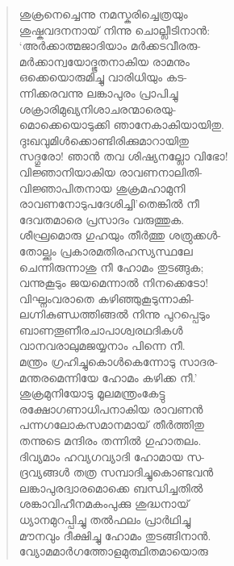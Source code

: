 \begin{verse}
ശുക്രനെച്ചെന്നു നമസ്കരിച്ചെത്രയും\\
ശുഷ്കവദനനായ് നിന്നു ചൊല്ലീടിനാന്‍:\\
‘അര്‍ക്കാത്മജാദിയാം മര്‍ക്കടവീരരു-\\
മര്‍ക്കാന്വയോദ്ഭൂതനാകിയ രാമനും\\
ഒക്കെയൊരുമിച്ചു വാരിധിയും കട-\\
ന്നിക്കരവന്നു ലങ്കാപുരം പ്രാപിച്ചു\\
ശക്രാരിമുഖ്യനിശാചരന്മാരെയു-\\
മൊക്കെയൊടുക്കി ഞാനേകാകിയായിതു.\\
ദുഃഖവുമിള്‍ക്കൊണ്ടിരിക്കുമാറായിതു\\
സദ്ഗുരോ! ഞാന്‍ തവ ശിഷ്യനല്ലോ വിഭോ!\\
വിജ്ഞാനിയാകിയ രാവണനാലിതി-\\
വിജ്ഞാപിതനായ ശുക്രമഹാമുനി\\
രാവണനോടുപദേശിച്ചി’തെങ്കില്‍ നീ\\
ദേവതമാരെ പ്രസാദം വരുത്തുക.\\
ശീഘ്രമൊരു ഗുഹയും തീര്‍ത്തു ശത്രുക്കള്‍-\\
തോല്ക്കും പ്രകാരമതിരഹസ്യസ്ഥലേ\\
ചെന്നിരുന്നാശു നീ ഹോമം തുടങ്ങുക;\\
വന്നുകൂടും ജയമെന്നാല്‍ നിനക്കെടോ!\\
വിഘ്നംവരാതെ കഴിഞ്ഞുകൂടുന്നാകി-\\
ലഗ്നികുണ്ഡത്തിങ്ങല്‍ നിന്നു പുറപ്പെടും\\
ബാണതൂണീരചാപാശ്വരഥദികള്‍\\
വാനവരാലുമജയ്യനാം പിന്നെ നീ.\\
മന്ത്രം ഗ്രഹിച്ചുകൊള്‍കെന്നോടു സാദര-\\
മന്തരമെന്നിയേ ഹോമം കഴിക്ക നീ.’\\
ശുക്രമുനിയോടു മൂലമന്ത്രംകേട്ടു\\
രക്ഷോഗണാധിപനാകിയ രാവണന്‍\\
പന്നഗലോകസമാനമായ് തീര്‍ത്തിതു\\
തന്നുടെ മന്ദിരം തന്നില്‍ ഗുഹാതലം.\\
ദിവ്യമാം ഹവ്യഗവ്യാദി ഹോമായ സ-\\
ദ്രവ്യങ്ങള്‍ തത്ര സമ്പാദിച്ചുകൊണ്ടവന്‍\\
ലങ്കാപുരദ്വാരമൊക്കെ ബന്ധിച്ചതില്‍\\
ശങ്കാവിഹീനമകംപുക്കു ശുദ്ധനായ്\\
ധ്യാനമുറപ്പിച്ചു തല്‍ഫലം പ്രാര്‍ഥിച്ചു\\
മൗനവും ദീക്ഷിച്ചു ഹോമം തുടങ്ങിനാന്‍.\\
വ്യോമമാര്‍ഗത്തോളമുത്ഥിതമായൊരു\\

\end{verse}
